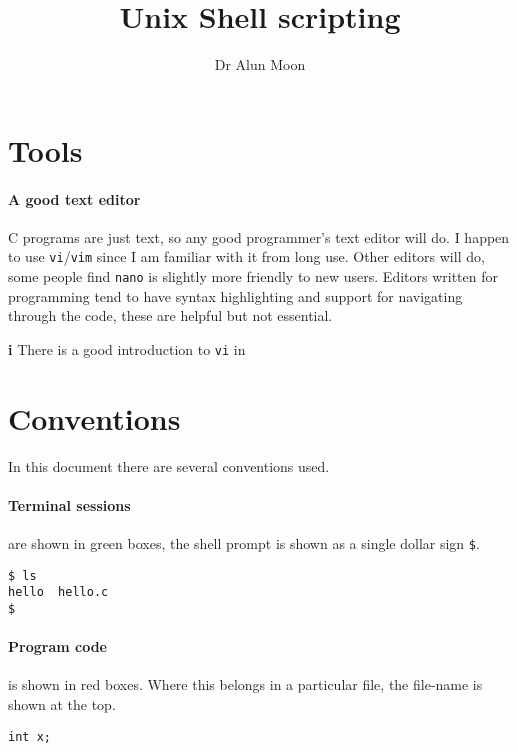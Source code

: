 \documentclass[12pt,a4paper]{article}
\title{Unix Shell scripting}
\author{Dr Alun Moon}
\begin{document}
\maketitle

\section{Tools}

\paragraph{A good text editor} C programs are just text, so any
good programmer's text editor will do.  I happen to use \verb'vi'/\verb'vim'
since I am familiar with it from long use.  Other editors will do, some people
find \verb'nano' is slightly more friendly to new users.  Editors written for
programming tend to have syntax highlighting and support for navigating through
the code, these are helpful but not essential.

\begin{note}{\Large\textbf i}
	There is a good introduction to \texttt{vi} in \cite[chapter 12]{Shotts}
\end{note}

\section{Conventions}
In this document there are several conventions used.

\paragraph{Terminal sessions} are shown in green boxes, the shell prompt is
shown as a single dollar sign \verb'$'.
\begin{terminal}
\begin{verbatim}
$ ls
hello  hello.c
$
\end{verbatim}
\end{terminal}

\paragraph{Program code} is shown in red boxes.  Where this belongs in a
particular file, the file-name is shown at the top.
\begin{code}[title=filename.c]
\begin{verbatim}
int x;
\end{verbatim}
\end{code}
\end{document}
